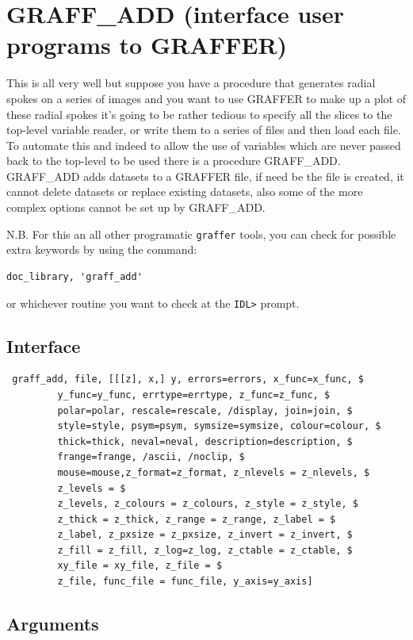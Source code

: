 \documentclass[11pt,twoside,english]{article}
\begin{document}
\section{GRAFF\_ADD (interface user programs to GRAFFER)}
\label{sec:graff_add}

This is all very well but suppose you have a procedure that generates
radial spokes on a series of images and you want to use GRAFFER to make
up a plot of these radial spokes it's going to be rather tedious to
specify all the slices to the top-level variable reader, or write them
to a series of files and then load each file. To automate this and
indeed to allow the use of variables which are never passed back to the
top-level to be used there is a procedure GRAFF\_ADD. GRAFF\_ADD adds
datasets to a GRAFFER file, if need be the file is created, it cannot
delete datasets or replace existing datasets, also some of the more
complex options cannot be set up by GRAFF\_ADD.

N.B. For this an all other programatic \texttt{graffer} tools, you can
check for possible extra keywords by using the command:
\begin{verbatim}
doc_library, 'graff_add'
\end{verbatim}
or whichever routine you want to check at the \texttt{IDL>} prompt.

\subsection{Interface}

\begin{verbatim}
 graff_add, file, [[[z], x,] y, errors=errors, x_func=x_func, $
         y_func=y_func, errtype=errtype, z_func=z_func, $
         polar=polar, rescale=rescale, /display, join=join, $
         style=style, psym=psym, symsize=symsize, colour=colour, $
         thick=thick, neval=neval, description=description, $
         frange=frange, /ascii, /noclip, $
         mouse=mouse,z_format=z_format, z_nlevels = z_nlevels, $
         z_levels = $ 
         z_levels, z_colours = z_colours, z_style = z_style, $
         z_thick = z_thick, z_range = z_range, z_label = $
         z_label, z_pxsize = z_pxsize, z_invert = z_invert, $
         z_fill = z_fill, z_log=z_log, z_ctable = z_ctable, $
         xy_file = xy_file, z_file = $
         z_file, func_file = func_file, y_axis=y_axis]
\end{verbatim}

\subsection{Arguments}
\end{document}
